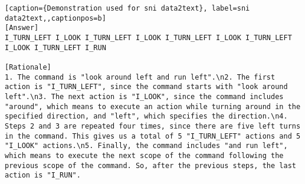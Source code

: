 \begin{lstlisting}[caption={Demonstration used for sni data2text}, label=sni data2text,,captionpos=b]
[Answer]
I_TURN_LEFT I_LOOK I_TURN_LEFT I_LOOK I_TURN_LEFT I_LOOK I_TURN_LEFT I_LOOK I_TURN_LEFT I_RUN

[Rationale]
1. The command is "look around left and run left".\n2. The first action is "I_TURN_LEFT", since the command starts with "look around left".\n3. The next action is "I_LOOK", since the command includes "around", which means to execute an action while turning around in the specified direction, and "left", which specifies the direction.\n4. Steps 2 and 3 are repeated four times, since there are five left turns in the command. This gives us a total of 5 "I_TURN_LEFT" actions and 5 "I_LOOK" actions.\n5. Finally, the command includes "and run left", which means to execute the next scope of the command following the previous scope of the command. So, after the previous steps, the last action is "I_RUN".




\end{lstlisting}

